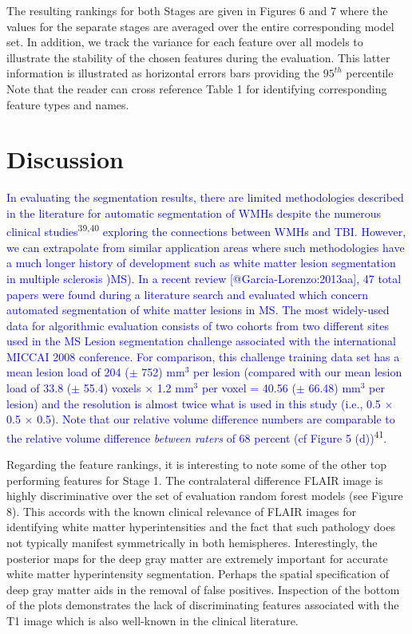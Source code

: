 \documentclass[11pt,]{article}
\begin{document}
The resulting rankings for both Stages are given in Figures 6 and 7
where the values for the separate stages are averaged over the entire
corresponding model set. In addition, we track the variance for each
feature over all models to illustrate the stability of the chosen
features during the evaluation. This latter information is illustrated
as horizontal errors bars providing the \(95^{th}\) percentile Note that
the reader can cross reference Table 1 for identifying corresponding
feature types and names.

\section{Discussion}\label{discussion}

\textcolor{blue}{
In evaluating the segmentation results, there are limited methodologies described in the
literature for automatic segmentation of WMHs despite the numerous clinical studies}\textsuperscript{39,40}
\textcolor{blue}{exploring the connections between WMHs and TBI.
However, we can extrapolate from similar application areas where such methodologies have a
much longer history of development such as white matter lesion segmentation in
multiple sclerosis )MS).  In a recent review [@Garcia-Lorenzo:2013aa], 47 total papers
were found during a literature search and evaluated which concern automated segmentation of white
matter lesions in MS.  The most widely-used data for algorithmic evaluation consists
of two cohorts from two different sites used in
the MS Lesion segmentation challenge associated with the international MICCAI 2008
conference.  For comparison, this challenge training data set
has a mean lesion load of 204 ($\pm$ 752) mm$^3$ per lesion (compared with
our mean lesion load of 33.8 ($\pm$ 55.4) voxels $\times$ 1.2 mm$^3$ per voxel =
40.56 ($\pm$ 66.48) mm$^3$ per lesion) and the resolution is
almost twice what is used in this study (i.e., 0.5 $\times$ 0.5 $\times$ 0.5).
Note that our relative volume difference numbers are comparable to the
relative volume difference {\em between raters} of 68 percent (cf Figure 5 (d))}\textsuperscript{41}.

Regarding the feature rankings, it is interesting to note some of the
other top performing features for Stage 1. The contralateral difference
FLAIR image is highly discriminative over the set of evaluation random
forest models (see Figure 8). This accords with the known clinical
relevance of FLAIR images for identifying white matter hyperintensities
and the fact that such pathology does not typically manifest
symmetrically in both hemispheres. Interestingly, the posterior maps for
the deep gray matter are extremely important for accurate white matter
hyperintensity segmentation. Perhaps the spatial specification of deep
gray matter aids in the removal of false positives. Inspection of the
bottom of the plots demonstrates the lack of discriminating features
associated with the T1 image which is also well-known in the clinical
literature.
\end{document}
